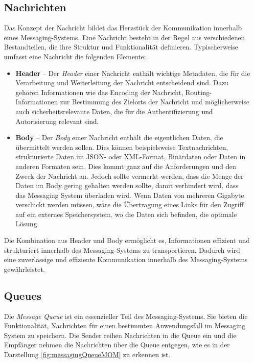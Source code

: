 \subsection{Nachrichten}

Das Konzept der Nachricht bildet das Herzstück der Kommunikation innerhalb eines Messaging-Systems. Eine Nachricht besteht in der Regel aus verschiedenen Bestandteilen, die ihre Struktur und Funktionalität definieren. Typischerweise umfasst eine Nachricht die folgenden Elemente: \cite{toshevLearningRabbitMQBuild2016}

\begin{itemize}
	\item \textbf{Header} -- Der \emph{Header} einer Nachricht enthält wichtige Metadaten, die für die Verarbeitung und Weiterleitung der Nachricht entscheidend sind. Dazu gehören Informationen wie das Encoding der Nachricht, Routing-Informationen zur Bestimmung des Zielorts der Nachricht und möglicherweise auch sicherheitsrelevante Daten, die für die Authentifizierung und Autorisierung relevant sind.

	\item \textbf{Body} -- Der \emph{Body} einer Nachricht enthält die eigentlichen Daten, die übermittelt werden sollen. Dies können beispielsweise Textnachrichten, strukturierte Daten im JSON- oder XML-Format, Binärdaten oder Daten in anderen Formaten sein. Dies kommt ganz auf die Anforderungen und den Zweck der Nachricht an. Jedoch sollte vermerkt werden, dass die Menge der Daten im Body gering gehalten werden sollte, damit verhindert wird, dass das Messaging System überladen wird. Wenn Daten von mehreren Gigabyte verschickt werden müssen, wäre die Übertragung eines Links für den Zugriff auf ein externes Speichersystem, wo die Daten sich befinden, die optimale Lösung.
\end{itemize}

Die Kombination aus Header und Body ermöglicht es, Informationen effizient und strukturiert innerhalb des Messaging-Systems zu transportieren. Dadurch wird eine zuverlässige und effiziente Kommunikation innerhalb des Messaging-Systems gewährleistet.

\subsection{Queues}

Die \emph{Message Queue} ist ein essenzieller Teil des Messaging-Systems. Sie bieten die Funktionalität, Nachrichten für einen bestimmten Anwendungsfall im Messaging System zu speichern. Die Sender reihen Nachrichten in die Queue ein und die Empfänger nehmen die Nachrichten über die Queue entgegen, wie es in der Darstellung \ref{fig:messagingQueueMOM} zu erkennen ist. \cite{curryMessageOrientedMiddleware2004}

